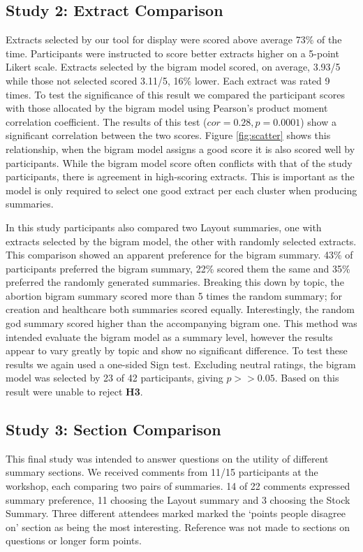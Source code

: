     \tocless\subsection{Study 2: Extract Comparison}
    Extracts selected by our tool for display were scored above average 73\% of the time. Participants were instructed to score better extracts higher on a 5-point Likert scale. Extracts selected by the bigram model scored, on average, 3.93/5 while those not selected scored 3.11/5, 16\% lower. Each extract was rated 9 times. To test the significance of this result we compared the participant scores with those allocated by the bigram model using Pearson's product moment correlation coefficient. The results of this test ($cor = 0.28, p = 0.0001$) show a significant correlation between the two scores. Figure \ref{fig:scatter} shows this relationship, when the bigram model assigns a good score it is also scored well by participants. While the bigram model score often conflicts with that of the study participants, there is agreement in high-scoring extracts. This is important as the model is only required to select one good extract per each cluster when producing summaries.

      In this study participants also compared two Layout summaries, one with extracts selected by the bigram model, the other with randomly selected extracts. This comparison showed an apparent preference for the bigram summary. 43\% of participants preferred the bigram summary, 22\% scored them the same and 35\% preferred the randomly generated summaries. Breaking this down by topic, the abortion bigram summary scored more than 5 times the random summary; for creation and healthcare both summaries scored equally. Interestingly, the random god summary scored higher than the accompanying bigram one. This method was intended evaluate the bigram model as a summary level, however the results appear to vary greatly by topic and show no significant difference. To test these results we again used a one-sided Sign test. Excluding neutral ratings, the bigram model was selected by 23 of 42 participants, giving $p >> 0.05$. Based on this result were unable to reject \textbf{H3}.

    \tocless\subsection{Study 3: Section Comparison}
      This final study was intended to answer questions on the utility of different summary sections. We received comments from 11/15 participants at the workshop, each comparing two pairs of summaries. 14 of 22 comments expressed summary preference, 11 choosing the Layout summary and 3 choosing the Stock Summary. Three different attendees marked marked the `points people disagree on' section as being the most interesting. Reference was not made to sections on questions or longer form points.

